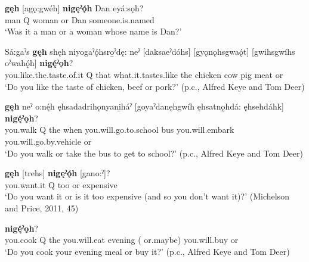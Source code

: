 \ea
\label{ex:gpar55}
\gll [Hǫ:gwéh] \textbf{gęh} [agǫ:gwéh] \textbf{nigęˀǫ́h} Dan eyá:sǫh?\\
man Q woman or Dan someone.is.named\\
\glt ‘Was it a man or a woman whose name is Dan?’
\z


\ea
\label{ex:gpar56}
\gll Sá:gaˀs \textbf{gęh} shęh niyogaˀǫ́hsro̱ˀdę: neˀ [daksaeˀdóhs] [gyǫnǫhsgwaǫ́t] [gwihsgwíhs oˀwahǫ́h] \textbf{nigę́ˀǫh}?\\
you.like.the.taste.of.it Q that what.it.tastes.like the chicken cow pig meat or\\
\glt ‘Do you like the taste of chicken, beef or pork?’ (p.c., Alfred Keye and Tom Deer)
\z


\ea
\label{ex:gpar57}
\gll [Desatahahkwáˀ] \textbf{gęh} neˀ o:nę́h ęhsadadrihǫnyani̱háˀ [goyaˀdanęhgwíh ęhsatnǫ̱hdá: ęhsehdáhk] \textbf{nigę́ˀǫh}?\\
you.walk Q the when you.will.go.to.school bus you.will.embark you.will.go.by.vehicle or\\
\glt ‘Do you walk or take the bus to get to school?’ (p.c., Alfred Keye and Tom Deer)
\z


\ea
\label{ex:gpar58}
 \textbf{gęh} [trehs] \textbf{nigęˀǫ́h} [gano:ˀ]?\\
you.want.it Q too or expensive\\
\glt ‘Do you want it or is it too expensive (and so you don’t want it)?’ (Michelson and Price, 2011, 45)
\z


\ea
\label{ex:gpar59}
 \textbf{nigę́ˀǫh}?\\
you.cook Q the you.will.eat evening ({} or.maybe) you.will.buy or\\
\glt ‘Do you cook your evening meal or buy it?’ (p.c., Alfred Keye and Tom Deer)
\z



